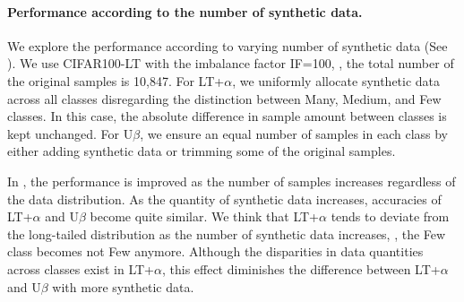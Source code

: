 \paragraph{Performance according to the number of synthetic data.}
We explore the performance according to 
varying number of synthetic data (See ).
We use CIFAR100-LT with the imbalance factor IF=100, \ie, 
the total number of the original samples is 10,847.
For LT+$\alpha$, we uniformly allocate
synthetic data across all classes disregarding the distinction between Many, Medium, and Few classes.
In this case, the absolute difference in sample amount between classes is kept unchanged.
For U$\beta$, we ensure an equal number of samples in each class by either adding synthetic data or trimming some of the original samples.


In , the performance is improved as the number of samples increases regardless of the data distribution.
As the quantity of synthetic data increases, accuracies of LT+$\alpha$ and U$\beta$ become quite similar.
% 
We think that LT+$\alpha$ tends to deviate from the long-tailed distribution as the number
of synthetic data increases, \ie, the Few class becomes not Few anymore. Although the disparities 
in data quantities across classes exist in LT+$\alpha$, this effect diminishes the difference 
between LT+$\alpha$ and U$\beta$ with more synthetic data.





